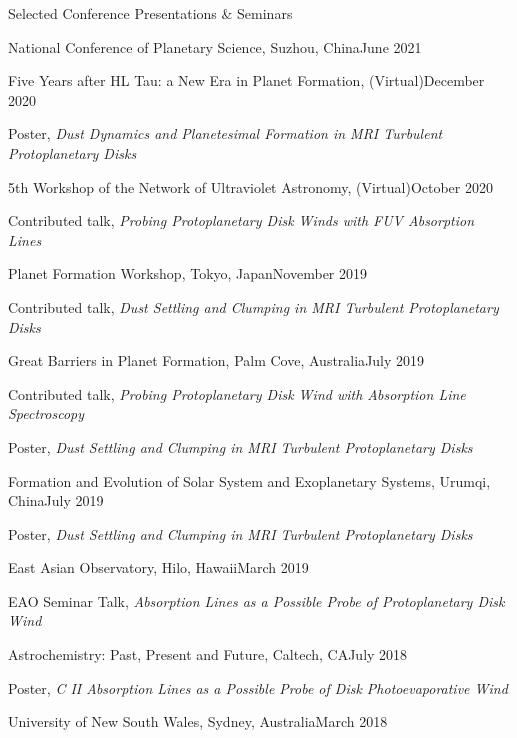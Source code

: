 \documentclass{resume} %
\begin{document}
\begin{rSection}{Selected Conference Presentations \& Seminars}
\begin{rSubsection}{National Conference of Planetary Science, Suzhou, China}{June 2021}{}{}
\end{rSubsection}
\begin{rSubsection}{Five Years after HL Tau: a New Era in Planet Formation, (Virtual)}{December 2020}{}{}
\item Poster, \emph{Dust Dynamics and Planetesimal Formation in MRI Turbulent Protoplanetary Disks} 
\end{rSubsection}
\begin{rSubsection}{5th Workshop of the Network of Ultraviolet Astronomy, (Virtual)}{October 2020}{}{}
\item Contributed talk, \emph{Probing Protoplanetary Disk Winds with FUV Absorption Lines} 
\end{rSubsection}
\begin{rSubsection}{Planet Formation Workshop, Tokyo, Japan}{November 2019}{}{}
\item Contributed talk, \emph{Dust Settling and Clumping in MRI Turbulent Protoplanetary Disks} 
\end{rSubsection}
\begin{rSubsection}{Great Barriers in Planet Formation, Palm Cove, Australia}{July 2019}{}{}
\item Contributed talk, \emph{Probing Protoplanetary Disk Wind with Absorption Line Spectroscopy} 
\item Poster, \emph{Dust Settling and Clumping in MRI Turbulent Protoplanetary Disks} 
\end{rSubsection}
\begin{rSubsection}{Formation and Evolution of Solar System and Exoplanetary Systems, Urumqi, China}{July 2019}{}{}
\item Poster, \emph{Dust Settling and Clumping in MRI Turbulent Protoplanetary Disks}
\end{rSubsection}
\begin{rSubsection}{East Asian Observatory, Hilo, Hawaii}{March 2019}{}{}
\item EAO Seminar Talk, \emph{Absorption Lines as a Possible Probe of Protoplanetary Disk Wind} 
\end{rSubsection}
\begin{rSubsection}{Astrochemistry: Past, Present and Future, Caltech, CA}{July 2018}{}{}
\item Poster, \emph{C II Absorption Lines as a Possible Probe of Disk Photoevaporative Wind} 
\end{rSubsection}
\begin{rSubsection}{University of New South Wales, Sydney, Australia}{March 2018}{}{}

\end{rSubsection}
\end{rSection}
\end{document}
